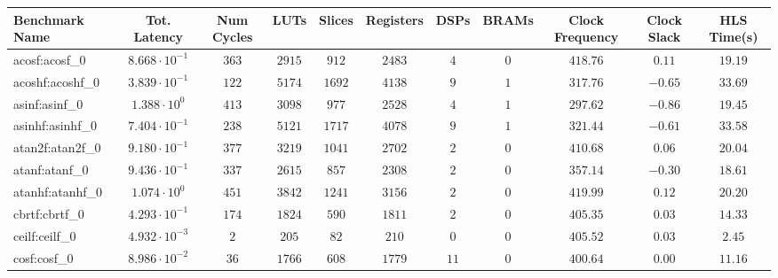 \begin{tabular}{|l|c|c|c|c|c|c|c|c|c|c|}
\hline
Benchmark Name               & Tot. Latency            & Num Cycles & LUTs      & Slices    & Registers & DSPs    & BRAMs & Clock Frequency & Clock Slack & HLS Time(s) \\
\hline
acosf:acosf\_0               & $ 8.668 \cdot 10^{-1} $ & $ 363    $ & $ 2915  $ & $ 912   $ & $ 2483  $ & $ 4   $ & $ 0 $ & $ 418.76      $ & $ 0.11    $ & $ 19.19   $ \\
acoshf:acoshf\_0             & $ 3.839 \cdot 10^{-1} $ & $ 122    $ & $ 5174  $ & $ 1692  $ & $ 4138  $ & $ 9   $ & $ 1 $ & $ 317.76      $ & $ -0.65   $ & $ 33.69   $ \\
asinf:asinf\_0               & $ 1.388 \cdot 10^{0}  $ & $ 413    $ & $ 3098  $ & $ 977   $ & $ 2528  $ & $ 4   $ & $ 1 $ & $ 297.62      $ & $ -0.86   $ & $ 19.45   $ \\
asinhf:asinhf\_0             & $ 7.404 \cdot 10^{-1} $ & $ 238    $ & $ 5121  $ & $ 1717  $ & $ 4078  $ & $ 9   $ & $ 1 $ & $ 321.44      $ & $ -0.61   $ & $ 33.58   $ \\
atan2f:atan2f\_0             & $ 9.180 \cdot 10^{-1} $ & $ 377    $ & $ 3219  $ & $ 1041  $ & $ 2702  $ & $ 2   $ & $ 0 $ & $ 410.68      $ & $ 0.06    $ & $ 20.04   $ \\
atanf:atanf\_0               & $ 9.436 \cdot 10^{-1} $ & $ 337    $ & $ 2615  $ & $ 857   $ & $ 2308  $ & $ 2   $ & $ 0 $ & $ 357.14      $ & $ -0.30   $ & $ 18.61   $ \\
atanhf:atanhf\_0             & $ 1.074 \cdot 10^{0}  $ & $ 451    $ & $ 3842  $ & $ 1241  $ & $ 3156  $ & $ 2   $ & $ 0 $ & $ 419.99      $ & $ 0.12    $ & $ 20.20   $ \\
cbrtf:cbrtf\_0               & $ 4.293 \cdot 10^{-1} $ & $ 174    $ & $ 1824  $ & $ 590   $ & $ 1811  $ & $ 2   $ & $ 0 $ & $ 405.35      $ & $ 0.03    $ & $ 14.33   $ \\
ceilf:ceilf\_0               & $ 4.932 \cdot 10^{-3} $ & $ 2      $ & $ 205   $ & $ 82    $ & $ 210   $ & $ 0   $ & $ 0 $ & $ 405.52      $ & $ 0.03    $ & $ 2.45    $ \\
cosf:cosf\_0                 & $ 8.986 \cdot 10^{-2} $ & $ 36     $ & $ 1766  $ & $ 608   $ & $ 1779  $ & $ 11  $ & $ 0 $ & $ 400.64      $ & $ 0.00    $ & $ 11.16   $ \\

\end{tabular}
